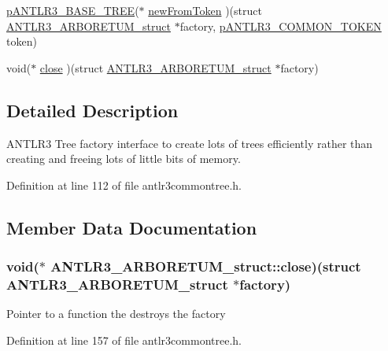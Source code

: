 \begin{DoxyCompactItemize}
\item 
\hyperlink{antlr3interfaces_8h_a6313a8a3e8f044398a393bd10c083852}{p\-A\-N\-T\-L\-R3\-\_\-\-B\-A\-S\-E\-\_\-\-T\-R\-E\-E}($\ast$ \hyperlink{struct_a_n_t_l_r3___a_r_b_o_r_e_t_u_m__struct_abb466f6a3cbd9c564afac3df05c17a58}{new\-From\-Token} )(struct \hyperlink{struct_a_n_t_l_r3___a_r_b_o_r_e_t_u_m__struct}{A\-N\-T\-L\-R3\-\_\-\-A\-R\-B\-O\-R\-E\-T\-U\-M\-\_\-struct} $\ast$factory, \hyperlink{antlr3interfaces_8h_adaa6df9cbf0cd7ab37fd545520ff299b}{p\-A\-N\-T\-L\-R3\-\_\-\-C\-O\-M\-M\-O\-N\-\_\-\-T\-O\-K\-E\-N} token)
\item 
void($\ast$ \hyperlink{struct_a_n_t_l_r3___a_r_b_o_r_e_t_u_m__struct_a660071d49ae325d90d74c84d635f44f0}{close} )(struct \hyperlink{struct_a_n_t_l_r3___a_r_b_o_r_e_t_u_m__struct}{A\-N\-T\-L\-R3\-\_\-\-A\-R\-B\-O\-R\-E\-T\-U\-M\-\_\-struct} $\ast$factory)
\end{DoxyCompactItemize}


\subsection{Detailed Description}
A\-N\-T\-L\-R3 Tree factory interface to create lots of trees efficiently rather than creating and freeing lots of little bits of memory. 

Definition at line 112 of file antlr3commontree.\-h.



\subsection{Member Data Documentation}
\hypertarget{struct_a_n_t_l_r3___a_r_b_o_r_e_t_u_m__struct_a660071d49ae325d90d74c84d635f44f0}{
\subsubsection[{close}]{\setlength{\rightskip}{0pt plus 5cm}void($\ast$ A\-N\-T\-L\-R3\-\_\-\-A\-R\-B\-O\-R\-E\-T\-U\-M\-\_\-struct\-::close)(struct {\bf A\-N\-T\-L\-R3\-\_\-\-A\-R\-B\-O\-R\-E\-T\-U\-M\-\_\-struct} $\ast$factory)}}\label{struct_a_n_t_l_r3___a_r_b_o_r_e_t_u_m__struct_a660071d49ae325d90d74c84d635f44f0}
Pointer to a function the destroys the factory 

Definition at line 157 of file antlr3commontree.\-h.

